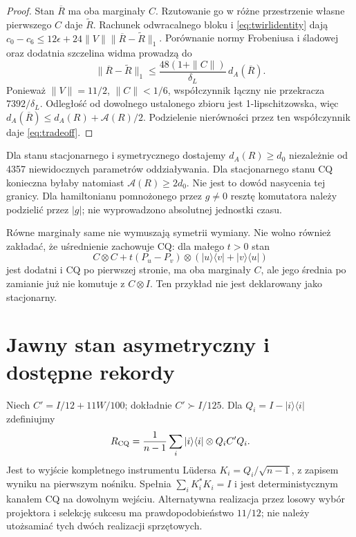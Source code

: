 \documentclass[11pt,a4paper]{article}
\begin{document}
\begin{proof}
Stan $\overline R$ ma oba marginały $C$. Rzutowanie go w różne
przestrzenie własne pierwszego $C$ daje $\widetilde R$.
Rachunek odwracalnego bloku i \eqref{eq:twirlidentity} dają
$c_0-c_6\le12\epsilon+24\|V\|\|\overline R-\widetilde R\|_1$.
Porównanie normy Frobeniusa i śladowej oraz dodatnia szczelina widma
prowadzą do
\[
 \|\overline R-\widetilde R\|_1
 \le\frac{48(1+\|C\|)}{\delta_L}\,d_A(\overline R).
\]
Ponieważ $\|V\|=11/2$, $\|C\|<1/6$, współczynnik łączny nie
przekracza $7392/\delta_L$. Odległość od dowolnego ustalonego zbioru
jest 1-lipschitzowska, więc
$d_A(\overline R)\le d_A(R)+\mathcal A(R)/2$.
Podzielenie nierówności przez ten współczynnik daje \eqref{eq:tradeoff}.
\end{proof}

Dla stanu stacjonarnego i symetrycznego dostajemy $d_A(R)\ge d_0$
niezależnie od 4357 niewidocznych parametrów oddziaływania.
Dla stacjonarnego stanu CQ konieczna byłaby natomiast
$\mathcal A(R)\ge2d_0$. Nie jest to dowód nasycenia tej granicy.
Dla hamiltonianu pomnożonego przez $g\ne0$ resztę komutatora należy
podzielić przez $|g|$; nie wyprowadzono absolutnej jednostki czasu.

Równe marginały same nie wymuszają symetrii wymiany. Nie wolno również
zakładać, że uśrednienie zachowuje CQ: dla małego $t>0$ stan
\[
 C\otimes C+t(P_u-P_v)\otimes(|u\rangle\langle v|+|v\rangle\langle u|)
\]
jest dodatni i CQ po pierwszej stronie, ma oba marginały $C$, ale
jego średnia po zamianie już nie komutuje z $C\otimes I$.
Ten przykład nie jest deklarowany jako stacjonarny.

\section{Jawny stan asymetryczny i dostępne rekordy}

Niech $C'=I/12+11W/100$; dokładnie $C'\succ I/125$.
Dla $Q_i=I-|i\rangle\langle i|$ zdefiniujmy
\begin{equation}\label{eq:cq}
 R_{\rm CQ}=\frac1{n-1}\sum_i |i\rangle\langle i|\otimes Q_iC'Q_i.
\end{equation}
Jest to wyjście kompletnego instrumentu Lüdersa
$K_i=Q_i/\sqrt{n-1}$, z zapisem wyniku na pierwszym nośniku.
Spełnia $\sum_iK_i^*K_i=I$ i jest deterministycznym kanałem CQ
na dowolnym wejściu. Alternatywna realizacja przez losowy wybór
projektora i selekcję sukcesu ma prawdopodobieństwo $11/12$;
nie należy utożsamiać tych dwóch realizacji sprzętowych.
\end{document}
